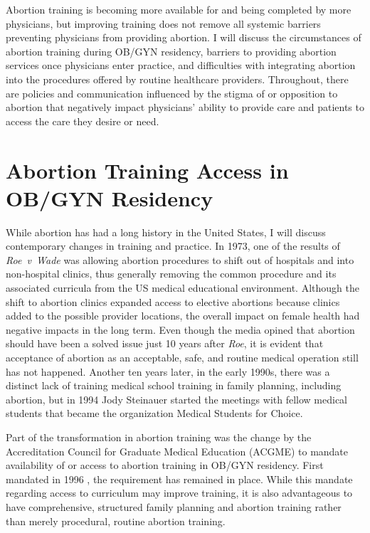\documentclass[letterpaper, 12pt]{article}
\begin{document}
Abortion training is becoming more available for and being completed by more physicians, but improving training does not remove all systemic barriers preventing physicians from providing abortion. I will discuss the circumstances of abortion training during OB/GYN residency, barriers to providing abortion services once physicians enter practice, and difficulties with integrating abortion into the procedures offered by routine healthcare providers. Throughout, there are policies and communication influenced by the stigma of or opposition to abortion that negatively impact physicians' ability to provide care and patients to access the care they desire or need.

\section*{Abortion Training Access in OB/GYN Residency}

While abortion has had a long history \autocite[For a thesis about training for both procedural and elective abortions in the United States from 1920 to 2007, see:][]{ayres_providing_2009} in the United States, I will discuss contemporary changes in training and practice.
In 1973, one of the results of \textit{Roe~v~Wade} was allowing abortion procedures to shift out of hospitals and into non-hospital clinics, thus generally removing the common procedure and its associated curricula from the US medical educational environment. \autocite[pg. 404]{aksel_unintended_2013}
Although the shift to abortion clinics expanded access to elective abortions because clinics added to the possible provider locations, the overall impact on female health had negative impacts in the long term.
Even though the media opined that abortion should have been a solved issue just 10 years after \textit{Roe}\autocite{mark_obenhaus_abortion_1983}, it is evident that acceptance of abortion as an acceptable, safe, and routine medical operation still has not happened.
Another ten years later, in the early 1990s, there was a distinct lack of training medical school training in family planning, including abortion, but in 1994 Jody Steinauer started the meetings with fellow medical students that became the organization Medical Students for Choice. \autocite[pg. 404--5]{aksel_unintended_2013}

Part of the transformation in abortion training was the change by the Accreditation Council for Graduate Medical Education (ACGME) to mandate availability of or access to abortion training in OB/GYN residency. \autocite[IV.A.6.d, pg. 17]{accreditation_council_for_graduate_medical_education_acgme_2014}
First mandated in 1996 \autocite[pg. 146]{freedman_obstacles_2010}, the requirement has remained in place.
While this mandate regarding access to curriculum may improve training, it is also advantageous to have comprehensive, structured family planning and abortion training rather than merely procedural, routine abortion training. \autocite[pg. 297]{macisaac_routine_2012}
\end{document}

